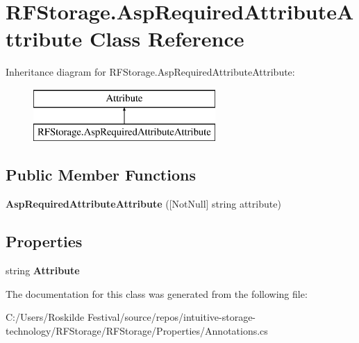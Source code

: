 \hypertarget{class_r_f_storage_1_1_asp_required_attribute_attribute}{}\section{R\+F\+Storage.\+Asp\+Required\+Attribute\+Attribute Class Reference}
\label{class_r_f_storage_1_1_asp_required_attribute_attribute}
Inheritance diagram for R\+F\+Storage.\+Asp\+Required\+Attribute\+Attribute\+:\begin{figure}[H]
\begin{center}
\leavevmode
\includegraphics[height=2.000000cm]{class_r_f_storage_1_1_asp_required_attribute_attribute}
\end{center}
\end{figure}
\subsection*{Public Member Functions}
\begin{DoxyCompactItemize}
\item 
\mbox{\label{class_r_f_storage_1_1_asp_required_attribute_attribute_ae66f571bd587613e14c895427eb1db77}} 
{\bfseries Asp\+Required\+Attribute\+Attribute} (\mbox{[}Not\+Null\mbox{]} string attribute)
\end{DoxyCompactItemize}
\subsection*{Properties}
\begin{DoxyCompactItemize}
\item 
\mbox{\label{class_r_f_storage_1_1_asp_required_attribute_attribute_a619996dcc66e972bc41d767c600f0442}} 
string {\bfseries Attribute}
\end{DoxyCompactItemize}


The documentation for this class was generated from the following file\+:\begin{DoxyCompactItemize}
\item 
C\+:/\+Users/\+Roskilde Festival/source/repos/intuitive-\/storage-\/technology/\+R\+F\+Storage/\+R\+F\+Storage/\+Properties/Annotations.\+cs\end{DoxyCompactItemize}
